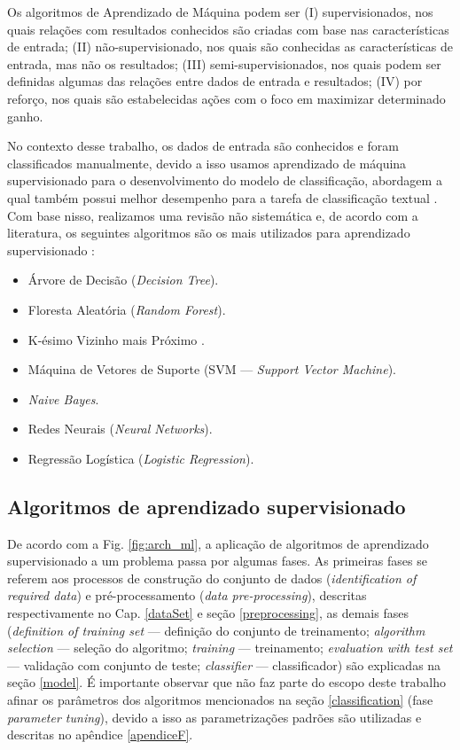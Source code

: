 \documentclass[
	12pt,				%
	oneside,			%
	a4paper,			%
	english,			%
	brazil				%
	]{abntex2ppgsi}
\begin{document}
Os algoritmos de Aprendizado de Máquina podem ser (I) supervisionados, nos quais relações com resultados conhecidos são criadas com base nas características de entrada; (II) não-supervisionado, nos quais são conhecidas as características de entrada, mas não os resultados; (III) semi-supervisionados, nos quais podem ser definidas algumas das relações entre dados de entrada e resultados; (IV) por reforço, nos quais são estabelecidas ações com o foco em maximizar determinado ganho.

No contexto desse trabalho, os dados de entrada são conhecidos e foram classificados manualmente, devido a isso usamos aprendizado de máquina supervisionado para o desenvolvimento do modelo de classificação, abordagem a qual também possui melhor desempenho para a tarefa de classificação textual \cite{dwivedi2016automatic}.  Com base nisso, realizamos uma revisão não sistemática e, de acordo com a literatura, os seguintes algoritmos são os mais utilizados para aprendizado supervisionado \cite{kotsiantis2007supervised, dwivedi2016automatic, narayanan2017survey}:

\begin{itemize}
\item Árvore de Decisão (\textit{Decision Tree}).
\item Floresta Aleatória (\textit{Random Forest}).
\item K-ésimo Vizinho mais Próximo .
\item Máquina de Vetores de Suporte ({SVM --- \textit{Support Vector Machine}}).
\item \textit{Naive Bayes}.
\item Redes Neurais (\textit{Neural Networks}).
\item Regressão Logística (\textit{Logistic Regression}).
\end{itemize}

\subsection{Algoritmos de aprendizado supervisionado}
\label{supervisionedLearning}

De acordo com a Fig. \ref{fig:arch_ml}, a aplicação de algoritmos de aprendizado supervisionado a um problema passa por algumas fases.
As primeiras fases se referem aos processos de construção do conjunto de dados (\textit{identification of required data}) e pré-processamento (\textit{data pre-processing}), descritas respectivamente no Cap. \ref{dataSet} e seção \ref{preprocessing}, as demais fases (\textit{definition of training set} --- definição do conjunto de treinamento; \textit{algorithm selection} --- seleção do algoritmo; \textit{training} --- treinamento; \textit{evaluation with test set} --- validação com conjunto de teste; \textit{classifier} --- classificador) são explicadas na seção \ref{model}. É importante observar que não faz parte do escopo deste trabalho afinar os parâmetros dos algoritmos mencionados na seção \ref{classification} (fase \textit{parameter tuning}), devido a isso as parametrizações padrões são utilizadas e descritas no apêndice \ref{apendiceF}.
\end{document}
